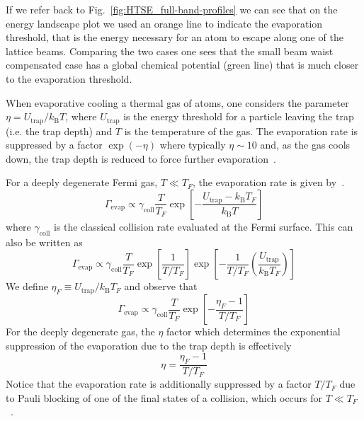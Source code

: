 \documentclass[11pt,letter]{article}
\newcommand{\kb}{\ensuremath{k_{\text{B}}}}
\begin{document}
If we refer back to Fig.~\ref{fig:HTSE_full-band-profiles}  we can see that on
the energy landscape plot we used an orange line to indicate the evaporation
threshold, that is the energy necessary for an atom to escape along one of the
lattice beams.  Comparing the two cases one sees that the small beam waist
compensated case has a global chemical potential (green line) that is much
closer to the evaporation threshold.

When evaporative cooling a thermal gas of atoms, one considers the parameter
$\eta=U_{\text{trap}}/\kb T$, where $U_{\text{trap}}$ is the energy threshold
for a particle leaving the trap (i.e. the trap depth) and $T$ is the
temperature of the gas.   The evaporation rate is suppressed by a factor
$\exp(-\eta)$ where  typically $\eta\sim10$ and, as the gas cools down, the trap
depth is reduced to force further evaporation~\cite{OHara2001}.  

For a deeply degenerate Fermi gas,  $T \ll T_{F}$, the evaporation rate is
given by~\cite{OHara2001}.
\begin{equation}
  \Gamma_{\text{evap}} \propto \gamma_{\text{coll}} \frac{T}{T_{F}} 
  \exp\left[ -   
  \frac{ U_{\text{trap}} - \kb T_{F} }{ \kb T }  \right ] 
\end{equation}
where $\gamma_{\text{coll}}$ is the classical collision rate evaluated at the
Fermi surface.  This can also be written as 
\begin{equation}
  \Gamma_{\text{evap}} \propto \gamma_{\text{coll}} \frac{T}{T_{F}}
  \exp\left[ \frac{1}{T/T_{F}} \right]  
  \exp\left[ -  \frac{1}{T/T_{F}} \left( \frac{U_{\text{trap}}}{\kb T_{F}} \right) \right] 
\end{equation}
We define $ \eta_{F} \equiv U_{\text{trap}}/\kb T_{F}$ and observe that 
\begin{equation}
  \Gamma_{\text{evap}} \propto \gamma_{\text{coll}} \frac{T}{T_{F}}
  \exp\left[ -  \frac{\eta_{F} - 1 }{ T/T_{F} } \right]
\end{equation}
For the deeply degenerate gas, the $\eta$ factor which determines the
exponential suppression of the evaporation due to the trap depth is effectively
\begin{equation}
 \eta = \frac{\eta_{F} - 1 }{T/T_{F} } 
\end{equation}
Notice that the evaporation rate is additionally suppressed by a factor
$T/T_{F}$ due to Pauli blocking of one of the final states of a collision, which
occurs for $T\ll T_{F}$~\cite{OHara2001}.
\end{document}
